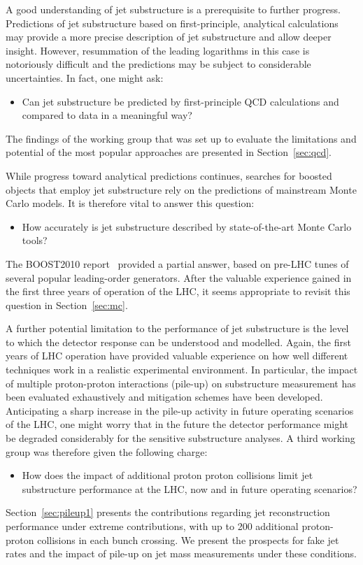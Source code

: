 A good understanding of jet substructure is a prerequisite to further
progress. Predictions of jet substructure based on first-principle,
analytical calculations may provide a more precise description
of jet substructure and allow deeper insight. However, resummation 
of the leading logarithms in this case is notoriously difficult and the
predictions may be subject to considerable uncertainties.
In fact, one might ask:
\begin{itemize}
\item Can jet substructure be predicted by first-principle QCD calculations
and compared to data in a meaningful way? 
\end{itemize}  
The findings of the working group that was set up to evaluate 
the limitations and potential of the most popular approaches are 
presented in Section~\ref{sec:qcd}.

While progress toward analytical predictions continues, searches for 
boosted objects that employ jet substructure rely on 
the predictions of mainstream Monte Carlo models. It is therefore
vital to answer this question:
\begin{itemize}
\item How accurately is jet substructure described by state-of-the-art Monte Carlo tools?
\end{itemize}
The BOOST2010 report~\cite{Abdesselam:2010pt} provided a 
partial answer, based on pre-LHC tunes of several popular leading-order 
generators. After the valuable experience gained in the first three years of 
operation of the LHC, it seems appropriate to revisit this question
 in Section~\ref{sec:mc}. 

A further potential limitation to the performance of jet substructure 
is the level to which the detector response can be understood and modelled. 
Again, the first years of LHC operation have provided valuable experience 
on how well different techniques work in a realistic experimental environment. 
In particular, the impact of multiple proton-proton 
interactions (pile-up) on substructure measurement has been evaluated
exhaustively and mitigation schemes have been developed. 
Anticipating a sharp increase in the pile-up activity in future operating
scenarios of the LHC, one might worry that in the future the detector 
performance might be degraded considerably for the sensitive 
substructure analyses. A third working group was therefore given the 
following charge:
\begin{itemize}
\item  How does the impact of additional proton proton collisions 
limit jet substructure performance at the LHC, now and in future 
operating scenarios?  
\end{itemize}
Section~\ref{sec:pileup1} presents the contributions 
regarding jet reconstruction performance under 
extreme contributions, with up to 200 additional proton-proton collisions
in each bunch crossing. We present the prospects for fake jet
rates and the impact of pile-up on jet mass measurements 
under these conditions.

